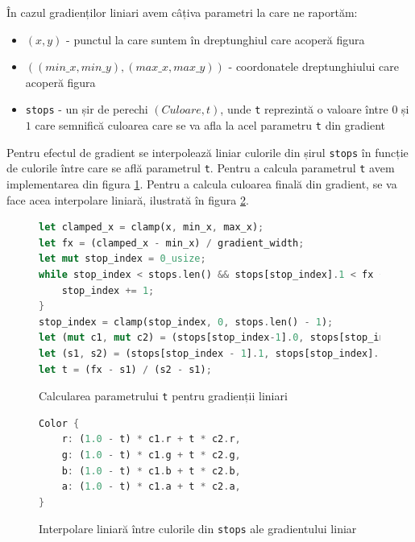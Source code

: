 \documentclass[a4paper, 12pt]{report}
\begin{document}
În cazul gradienților liniari avem câțiva parametri la care ne raportăm:

\begin{itemize}
    \item{\((x, y)\) - punctul la care suntem în dreptunghiul care acoperă figura}
    \item{\(((min\_x, min\_y), (max\_x, max\_y))\) - coordonatele dreptunghiului care acoperă figura}
    \item{\texttt{stops} - un șir de perechi \((Culoare, t)\), unde \texttt{t} reprezintă o valoare între \(0\) și \(1\)
                care semnifică culoarea care se va afla la acel parametru \texttt{t} din gradient}
\end{itemize}

Pentru efectul de gradient se interpolează liniar culorile din șirul \texttt{stops} în funcție de culorile între care se află
parametrul \texttt{t}. Pentru a calcula parametrul \texttt{t} avem implementarea din figura \ref{fig-linear-gradient-impl}.
Pentru a calcula culoarea finală din gradient, se va face acea interpolare liniară, ilustrată în figura \ref{fig-linear-gradient-interpolation}.

\begin{figure}[ht]
    \centering
    \begin{lstlisting}[language=Rust]
let clamped_x = clamp(x, min_x, max_x);
let fx = (clamped_x - min_x) / gradient_width;
let mut stop_index = 0_usize;
while stop_index < stops.len() && stops[stop_index].1 < fx {
    stop_index += 1;
}
stop_index = clamp(stop_index, 0, stops.len() - 1);
let (mut c1, mut c2) = (stops[stop_index-1].0, stops[stop_index].0);
let (s1, s2) = (stops[stop_index - 1].1, stops[stop_index].1);
let t = (fx - s1) / (s2 - s1);
    \end{lstlisting}
    \caption{Calcularea parametrului \texttt{t} pentru gradienții liniari}
    \label{fig-linear-gradient-impl}
\end{figure}

\begin{figure}[ht]
    \centering
    \begin{lstlisting}[language=Rust]
Color {
    r: (1.0 - t) * c1.r + t * c2.r,
    g: (1.0 - t) * c1.g + t * c2.g,
    b: (1.0 - t) * c1.b + t * c2.b,
    a: (1.0 - t) * c1.a + t * c2.a,
}
    \end{lstlisting}
    \caption{Interpolare liniară între culorile din \texttt{stops} ale gradientului liniar}
    \label{fig-linear-gradient-interpolation}
\end{figure}
\end{document}
